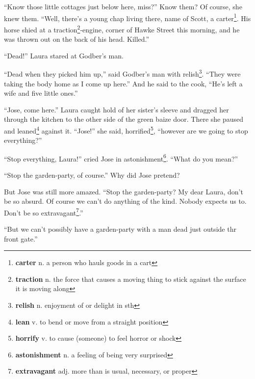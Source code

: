 ``Know those little cottages just below here, miss?'' Know them? Of course, she knew them. ``Well, there's a young chap living there, name of Scott, a carter\footnote{\textbf{carter} n. a person who hauls goods in a cart}. His horse shied at a traction\footnote{\textbf{traction} n. the force that causes a moving thing to stick against the surface it is moving along}-engine, corner of Hawke Street this morning, and he was thrown out on the back of his head. Killed.''

``Dead!'' Laura stared at Godber's man.

``Dead when they picked him up,'' said Godber's man with relish\footnote{\textbf{relish} n. enjoyment of or delight in sth}. ``They were taking the body home as I come up here.'' And he said to the cook, ``He's left a wife and five little ones.''

``Jose, come here.'' Laura caught hold of her sister's sleeve and dragged her through the kitchen to the other side of the green baize door. There she paused and leaned\footnote{\textbf{lean} v. to bend or move from a straight position} against it. ``Jose!'' she said, horrified\footnote{\textbf{horrify} v. to cause (someone) to feel horror or shock}, ``however are we going to stop everything?''

``Stop everything, Laura!'' cried Jose in astonishment\footnote{\textbf{astonishment} n. a feeling of being very surprised}. ``What do you mean?''

``Stop the garden-party, of course.'' Why did Jose pretend?

But Jose was still more amazed. ``Stop the garden-party? My dear Laura, don't be so absurd. Of course we can't do anything of the kind. Nobody expects us to. Don't be so extravagant\footnote{\textbf{extravagant} adj. more than is usual, necessary, or proper}.''

``But we can't possibly have a garden-party with a man dead just outside thr front gate.''


